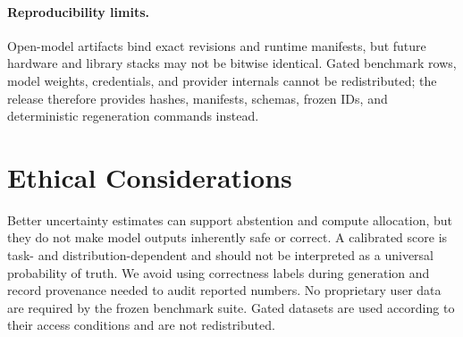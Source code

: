 \documentclass[10pt]{article}
\begin{document}
\paragraph{Reproducibility limits.} Open-model artifacts bind exact revisions and runtime manifests, but future hardware and library stacks may not be bitwise identical. Gated benchmark rows, model weights, credentials, and provider internals cannot be redistributed; the release therefore provides hashes, manifests, schemas, frozen IDs, and deterministic regeneration commands instead.

\section*{Ethical Considerations}

Better uncertainty estimates can support abstention and compute allocation, but they do not make model outputs inherently safe or correct.
A calibrated score is task- and distribution-dependent and should not be interpreted as a universal probability of truth.
We avoid using correctness labels during generation and record provenance needed to audit reported numbers.
No proprietary user data are required by the frozen benchmark suite.
Gated datasets are used according to their access conditions and are not redistributed.



\appendix

\end{document}
